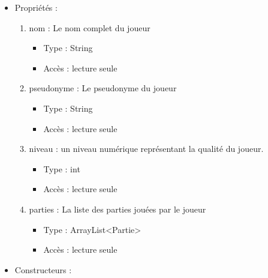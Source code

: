 \begin{itemize}

\item Propriétés : 
  \begin{enumerate}
  \item nom : Le nom complet du joueur 
    \begin{itemize}
    \item Type : String
    \item Accès : lecture seule
    \end{itemize}
  \item pseudonyme : Le pseudonyme du joueur
    \begin{itemize}
    \item Type : String
    \item Accès : lecture seule
    \end{itemize}
  \item niveau : un niveau numérique représentant la qualité du joueur.
    \begin{itemize}
    \item Type : int
    \item Accès : lecture seule
    \end{itemize}
  \item parties : La liste des parties jouées par le joueur
    \begin{itemize}
    \item Type : ArrayList<Partie>
    \item Accès : lecture seule
    \end{itemize}
  \end{enumerate}

\item Constructeurs : 


\end{itemize}
